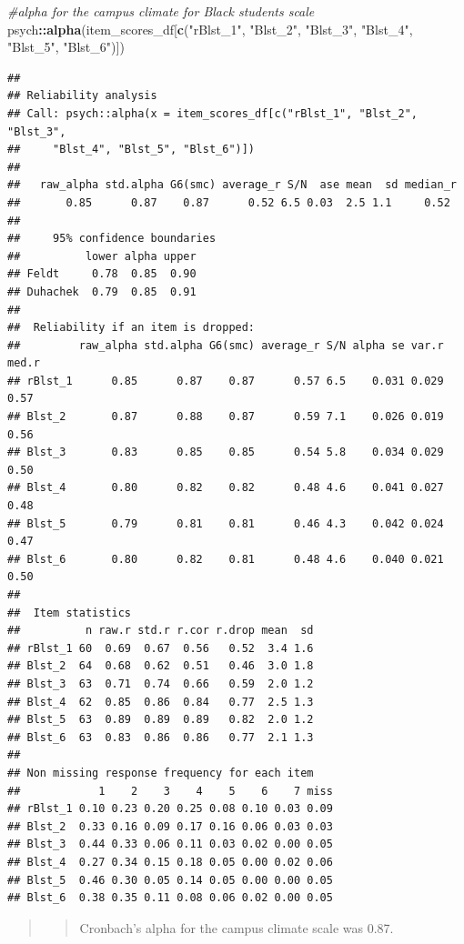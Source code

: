 \documentclass[
  11pt,
]{book}
\newenvironment{Shaded}{\begin{snugshade}}{\end{snugshade}}
\newcommand{\CommentTok}[1]{\textcolor[rgb]{0.37,0.37,0.37}{\textit{#1}}}
\newcommand{\FunctionTok}[1]{\textcolor[rgb]{0.27,0.27,0.27}{\textbf{#1}}}
\newcommand{\NormalTok}[1]{#1}
\newcommand{\SpecialCharTok}[1]{\textcolor[rgb]{0.43,0.43,0.43}{\textbf{#1}}}
\newcommand{\StringTok}[1]{\textcolor[rgb]{0.5,0.5,0.5}{#1}}
\begin{document}
\begin{Shaded}
\begin{Highlighting}[]
\CommentTok{\#alpha for the campus climate for Black students scale}
\NormalTok{psych}\SpecialCharTok{::}\FunctionTok{alpha}\NormalTok{(item\_scores\_df[}\FunctionTok{c}\NormalTok{(}\StringTok{"rBlst\_1"}\NormalTok{, }\StringTok{"Blst\_2"}\NormalTok{, }\StringTok{"Blst\_3"}\NormalTok{, }\StringTok{"Blst\_4"}\NormalTok{, }\StringTok{"Blst\_5"}\NormalTok{, }\StringTok{"Blst\_6"}\NormalTok{)])}
\end{Highlighting}
\end{Shaded}

\begin{verbatim}
## 
## Reliability analysis   
## Call: psych::alpha(x = item_scores_df[c("rBlst_1", "Blst_2", "Blst_3", 
##     "Blst_4", "Blst_5", "Blst_6")])
## 
##   raw_alpha std.alpha G6(smc) average_r S/N  ase mean  sd median_r
##       0.85      0.87    0.87      0.52 6.5 0.03  2.5 1.1     0.52
## 
##     95% confidence boundaries 
##          lower alpha upper
## Feldt     0.78  0.85  0.90
## Duhachek  0.79  0.85  0.91
## 
##  Reliability if an item is dropped:
##         raw_alpha std.alpha G6(smc) average_r S/N alpha se var.r med.r
## rBlst_1      0.85      0.87    0.87      0.57 6.5    0.031 0.029  0.57
## Blst_2       0.87      0.88    0.87      0.59 7.1    0.026 0.019  0.56
## Blst_3       0.83      0.85    0.85      0.54 5.8    0.034 0.029  0.50
## Blst_4       0.80      0.82    0.82      0.48 4.6    0.041 0.027  0.48
## Blst_5       0.79      0.81    0.81      0.46 4.3    0.042 0.024  0.47
## Blst_6       0.80      0.82    0.81      0.48 4.6    0.040 0.021  0.50
## 
##  Item statistics 
##          n raw.r std.r r.cor r.drop mean  sd
## rBlst_1 60  0.69  0.67  0.56   0.52  3.4 1.6
## Blst_2  64  0.68  0.62  0.51   0.46  3.0 1.8
## Blst_3  63  0.71  0.74  0.66   0.59  2.0 1.2
## Blst_4  62  0.85  0.86  0.84   0.77  2.5 1.3
## Blst_5  63  0.89  0.89  0.89   0.82  2.0 1.2
## Blst_6  63  0.83  0.86  0.86   0.77  2.1 1.3
## 
## Non missing response frequency for each item
##            1    2    3    4    5    6    7 miss
## rBlst_1 0.10 0.23 0.20 0.25 0.08 0.10 0.03 0.09
## Blst_2  0.33 0.16 0.09 0.17 0.16 0.06 0.03 0.03
## Blst_3  0.44 0.33 0.06 0.11 0.03 0.02 0.00 0.05
## Blst_4  0.27 0.34 0.15 0.18 0.05 0.00 0.02 0.06
## Blst_5  0.46 0.30 0.05 0.14 0.05 0.00 0.00 0.05
## Blst_6  0.38 0.35 0.11 0.08 0.06 0.02 0.00 0.05
\end{verbatim}

\begin{quote}
\begin{quote}
Cronbach's alpha for the campus climate scale was 0.87.
\end{quote}
\end{quote}
\end{document}
